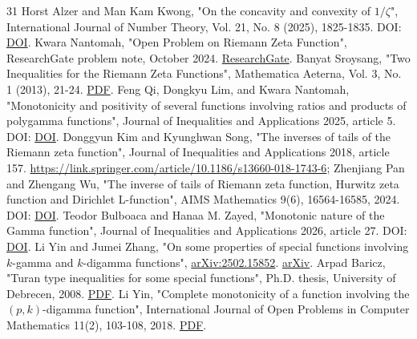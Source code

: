 \begin{thebibliography}{31}
 Horst Alzer and Man Kam Kwong, "On the concavity and convexity of \(1/\zeta\)", International Journal of Number Theory, Vol. 21, No. 8 (2025), 1825-1835. DOI: \href{https://doi.org/10.1142/S1793042125500897}{DOI}.
 Kwara Nantomah, "Open Problem on Riemann Zeta Function", ResearchGate problem note, October 2024. \href{https://www.researchgate.net/publication/384676538_Open_Problem_on_Riemann_Zeta_Function}{ResearchGate}.
 Banyat Sroysang, "Two Inequalities for the Riemann Zeta Functions", Mathematica Aeterna, Vol. 3, No. 1 (2013), 21-24. \href{https://arastirmax.com/en/system/files/dergiler/135290/makaleler/3/1/arastirmax-two-inequalities-riemann-zeta-functions.pdf}{PDF}.
 Feng Qi, Dongkyu Lim, and Kwara Nantomah, "Monotonicity and positivity of several functions involving ratios and products of polygamma functions", Journal of Inequalities and Applications 2025, article 5. DOI: \href{https://doi.org/10.1186/s13660-024-03245-8}{DOI}.
 Donggyun Kim and Kyunghwan Song, "The inverses of tails of the Riemann zeta function", Journal of Inequalities and Applications 2018, article 157. \href{https://link.springer.com/article/10.1186/s13660-018-1743-6}{https://link.springer.com/article/10.1186/s13660-018-1743-6}; Zhenjiang Pan and Zhengang Wu, "The inverse of tails of Riemann zeta function, Hurwitz zeta function and Dirichlet L-function", AIMS Mathematics 9(6), 16564-16585, 2024. DOI: \href{https://doi.org/10.3934/math.2024803}{DOI}.
 Teodor Bulboaca and Hanaa M. Zayed, "Monotonic nature of the Gamma function", Journal of Inequalities and Applications 2026, article 27. DOI: \href{https://doi.org/10.1186/s13660-025-03425-0}{DOI}.
 Li Yin and Jumei Zhang, "On some properties of special functions involving \(k\)-gamma and \(k\)-digamma functions", \href{https://arxiv.org/abs/2502.15852}{arXiv:2502.15852}. \href{https://arxiv.org/abs/2502.15852}{arXiv}.
 Arpad Baricz, "Turan type inequalities for some special functions", Ph.D. thesis, University of Debrecen, 2008. \href{https://dea.lib.unideb.hu/bitstreams/bdd4469f-1b1e-4996-9b90-73f5e1a6b0e8/download}{PDF}.
 Li Yin, "Complete monotonicity of a function involving the \((p,k)\)-digamma function", International Journal of Open Problems in Computer Mathematics 11(2), 103-108, 2018. \href{https://www.ijopcm.org/Vol/2018/2.9.pdf}{PDF}.

\end{thebibliography}
